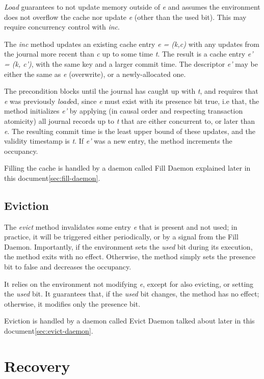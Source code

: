 \documentclass[twoside]{article}
\begin{document}
\emph{Load} guarantees to not update memory outside of \emph{e} and
assumes the environment does not overflow the cache nor update
\emph{e} (other than the used bit).
This may require concurrency control with \emph{inc}.

The \emph{inc} method updates an existing cache entry \emph{e = (k,c)}
with any updates from the journal more recent than \emph{c} up to some
time \emph{t}.
The result is a cache entry \emph{e' = (k, c')}, with the same key and a
larger commit time.
The descriptor \emph{e'} may be either the same as \emph{e} (overwrite),
or a newly-allocated one.

The precondition blocks until the journal has caught up with \emph{t},
and requires that \emph{e} was previously \emph{load}ed, since \emph{e}
must exist with its presence bit true, i.e that,
the method initializes \emph{e'} by applying (in causal order and
respecting transaction atomicity) all journal records up to \emph{t}
that are either concurrent to, or later than \emph{e}.
The resulting commit time is the least upper bound of these updates, and
the validity timestamp is \emph{t}.
If \emph{e'} was a new entry, the method increments the occupancy.

Filling the cache is handled by a daemon called Fill Daemon explained later 
in this document\ref{sec:fill-daemon}.

\subsection{Eviction}
\label{sec:eviction}

The \emph{evict} method invalidates some entry \emph{e} that is present
and not used; in practice, it will be triggered either periodically, or
by a signal from the Fill Daemon.
Importantly, if the environment sets the \emph{used} bit during its
execution, the method exits with no effect.
Otherwise, the method simply sets the presence bit to false and
decreases the occupancy.

It relies on the environment not modifying \emph{e}, except for also
evicting, or setting the \emph{used} bit.
It guarantees that, if the \emph{used} bit changes, the method has no
effect; otherwise, it modifies only the presence bit.

Eviction is handled by a daemon called Evict Daemon talked about later in this
document\ref{sec:evict-daemon}.

\section{Recovery}
\label{sec:recovery}
\end{document}

